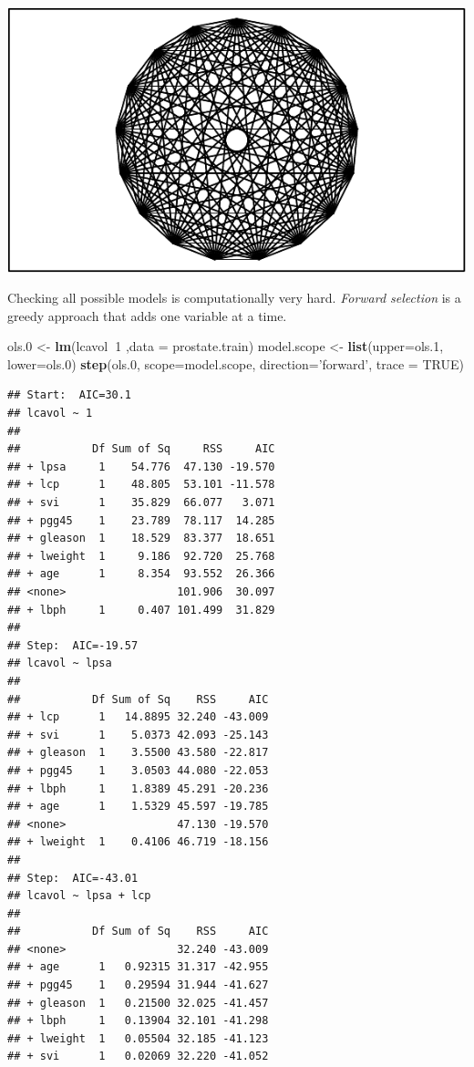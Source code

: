 \documentclass[]{book}
\newenvironment{Shaded}{\begin{snugshade}}{\end{snugshade}}
\newcommand{\KeywordTok}[1]{\textcolor[rgb]{0.13,0.29,0.53}{\textbf{#1}}}
\newcommand{\DataTypeTok}[1]{\textcolor[rgb]{0.13,0.29,0.53}{#1}}
\newcommand{\DecValTok}[1]{\textcolor[rgb]{0.00,0.00,0.81}{#1}}
\newcommand{\StringTok}[1]{\textcolor[rgb]{0.31,0.60,0.02}{#1}}
\newcommand{\OtherTok}[1]{\textcolor[rgb]{0.56,0.35,0.01}{#1}}
\newcommand{\OperatorTok}[1]{\textcolor[rgb]{0.81,0.36,0.00}{\textbf{#1}}}
\newcommand{\NormalTok}[1]{#1}
\theoremstyle{definition}
\theoremstyle{definition}
\theoremstyle{definition}
\theoremstyle{remark}
\begin{document}
\includegraphics[width=0.5\linewidth]{Rcourse_files/figure-latex/unnamed-chunk-221-1}

Checking all possible models is computationally very hard. \emph{Forward
selection} is a greedy approach that adds one variable at a time.

\begin{Shaded}
\begin{Highlighting}[]
\NormalTok{ols.}\DecValTok{0}\NormalTok{ <-}\StringTok{ }\KeywordTok{lm}\NormalTok{(lcavol}\OperatorTok{~}\DecValTok{1}\NormalTok{ ,}\DataTypeTok{data =}\NormalTok{ prostate.train)}
\NormalTok{model.scope <-}\StringTok{ }\KeywordTok{list}\NormalTok{(}\DataTypeTok{upper=}\NormalTok{ols.}\DecValTok{1}\NormalTok{, }\DataTypeTok{lower=}\NormalTok{ols.}\DecValTok{0}\NormalTok{)}
\KeywordTok{step}\NormalTok{(ols.}\DecValTok{0}\NormalTok{, }\DataTypeTok{scope=}\NormalTok{model.scope, }\DataTypeTok{direction=}\StringTok{'forward'}\NormalTok{, }\DataTypeTok{trace =} \OtherTok{TRUE}\NormalTok{)}
\end{Highlighting}
\end{Shaded}

\begin{verbatim}
## Start:  AIC=30.1
## lcavol ~ 1
## 
##           Df Sum of Sq     RSS     AIC
## + lpsa     1    54.776  47.130 -19.570
## + lcp      1    48.805  53.101 -11.578
## + svi      1    35.829  66.077   3.071
## + pgg45    1    23.789  78.117  14.285
## + gleason  1    18.529  83.377  18.651
## + lweight  1     9.186  92.720  25.768
## + age      1     8.354  93.552  26.366
## <none>                 101.906  30.097
## + lbph     1     0.407 101.499  31.829
## 
## Step:  AIC=-19.57
## lcavol ~ lpsa
## 
##           Df Sum of Sq    RSS     AIC
## + lcp      1   14.8895 32.240 -43.009
## + svi      1    5.0373 42.093 -25.143
## + gleason  1    3.5500 43.580 -22.817
## + pgg45    1    3.0503 44.080 -22.053
## + lbph     1    1.8389 45.291 -20.236
## + age      1    1.5329 45.597 -19.785
## <none>                 47.130 -19.570
## + lweight  1    0.4106 46.719 -18.156
## 
## Step:  AIC=-43.01
## lcavol ~ lpsa + lcp
## 
##           Df Sum of Sq    RSS     AIC
## <none>                 32.240 -43.009
## + age      1   0.92315 31.317 -42.955
## + pgg45    1   0.29594 31.944 -41.627
## + gleason  1   0.21500 32.025 -41.457
## + lbph     1   0.13904 32.101 -41.298
## + lweight  1   0.05504 32.185 -41.123
## + svi      1   0.02069 32.220 -41.052
\end{verbatim}
\end{document}
